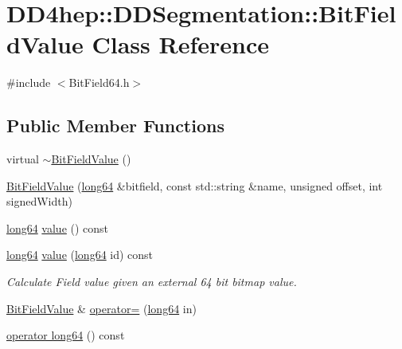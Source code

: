 \hypertarget{class_d_d4hep_1_1_d_d_segmentation_1_1_bit_field_value}{
\section{DD4hep::DDSegmentation::BitFieldValue Class Reference}
\label{class_d_d4hep_1_1_d_d_segmentation_1_1_bit_field_value}
}


{\ttfamily \#include $<$BitField64.h$>$}\subsection*{Public Member Functions}
\begin{DoxyCompactItemize}
\item 
virtual \hyperlink{class_d_d4hep_1_1_d_d_segmentation_1_1_bit_field_value_a182cf1a9ae2449b88fb89f37bba2abb7}{$\sim$BitFieldValue} ()
\item 
\hyperlink{class_d_d4hep_1_1_d_d_segmentation_1_1_bit_field_value_aa8ff52eb2b15cd6a50d6db56b658c80e}{BitFieldValue} (\hyperlink{namespace_d_d4hep_ac2a70e722b33dc7ddaa20db8954ac836}{long64} \&bitfield, const std::string \&name, unsigned offset, int signedWidth)
\item 
\hyperlink{namespace_d_d4hep_ac2a70e722b33dc7ddaa20db8954ac836}{long64} \hyperlink{class_d_d4hep_1_1_d_d_segmentation_1_1_bit_field_value_a5d269226e9aec30a8377f9a64bb5ff35}{value} () const 
\item 
\hyperlink{namespace_d_d4hep_ac2a70e722b33dc7ddaa20db8954ac836}{long64} \hyperlink{class_d_d4hep_1_1_d_d_segmentation_1_1_bit_field_value_ad25df427deb9fb0bc4fc61b5592db1cd}{value} (\hyperlink{namespace_d_d4hep_ac2a70e722b33dc7ddaa20db8954ac836}{long64} id) const 
\begin{DoxyCompactList}\small\item\em Calculate Field value given an external 64 bit bitmap value. \item\end{DoxyCompactList}\item 
\hyperlink{class_d_d4hep_1_1_d_d_segmentation_1_1_bit_field_value}{BitFieldValue} \& \hyperlink{class_d_d4hep_1_1_d_d_segmentation_1_1_bit_field_value_a0d388c5d7d243d80da663a23b420cfde}{operator=} (\hyperlink{namespace_d_d4hep_ac2a70e722b33dc7ddaa20db8954ac836}{long64} in)
\item 
\hyperlink{class_d_d4hep_1_1_d_d_segmentation_1_1_bit_field_value_a7f4fe22888949eeeb35d9c0a487d7d52}{operator long64} () const 

\end{DoxyCompactItemize}
